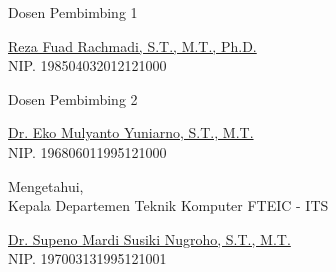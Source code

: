   \begin{center}
  
    \begin{multicols}{2}
  
      Dosen Pembimbing 1
      \vspace{12ex}
  
      \underline{Reza Fuad Rachmadi, S.T., M.T., Ph.D.} \\
      NIP. 198504032012121000
  
      \columnbreak
  
      Dosen Pembimbing 2
      \vspace{12ex}
  
      \underline{Dr. Eko Mulyanto Yuniarno, S.T., M.T.} \\
      NIP. 196806011995121000
  
    \end{multicols}
    \vspace{6ex}
  
    Mengetahui, \\
    Kepala Departemen Teknik Komputer FTEIC - ITS
    \vspace{12ex}
  
    \underline{Dr. Supeno Mardi Susiki Nugroho, S.T., M.T.} \\
    NIP. 197003131995121001
  
  \end{center}
